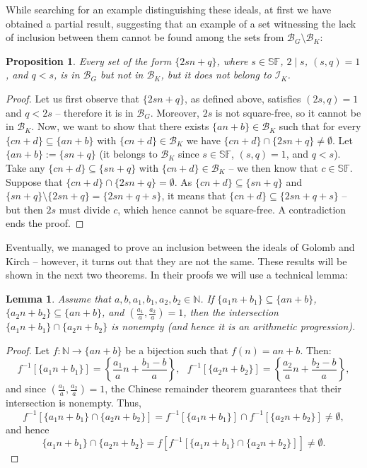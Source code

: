 \documentclass{amsart}
\newtheorem{lem}[thm]{Lemma}
\newtheorem{prop}[thm]{Proposition}
\theoremstyle{definition}
\theoremstyle{definition}
\newcommand{\N}{{\mathbb N}}
\newcommand{\I}{\mathcal I}
\newcommand{\B}{\mathcal{B}}
\newcommand{\SqrFr}{\mathbb{SF}}
\begin{document}
While searching for an example distinguishing these ideals, at first we have obtained a partial result, suggesting that an example of a set witnessing the lack of inclusion between them cannot be found among the sets from $\B_G \setminus \B_K$:

\begin{prop}
Every set of the form $\{2sn+q\}$, where $s \in\SqrFr$, $2\mid s$, $(s,q)=1$, and $q<s$, is in $\B_G$ but not in $\B_K$, but it does not belong to $\I_K$.
\end{prop}

\begin{proof}
Let us first observe that $\{2sn+q\}$, as defined above, satisfies $(2s,q)=1$ and $q<2s$ -- therefore it is in $\B_G$. Moreover, $2s$ is not square-free, so it cannot be in $\B_K$.
Now, we want to show that there exists $\{an+b\}\in \B_K$ such that for every $\{cn+d\}\subseteq \{an+b\}$ with $\{cn+d\}\in \B_K$ we have $\{cn+d\}\cap \{2sn+q\} \neq \emptyset$. Let $\{an+b\} := \{sn+q\}$ (it belongs to $\B_K$ since $s\in\SqrFr$, $(s,q)=1$, and $q<s$). Take any $\{cn+d\}\subseteq \{sn+q\}$ with $\{cn+d\}\in \B_K$ -- we then know that $c\in\SqrFr$. Suppose that $\{cn+d\}\cap \{2sn+q\} = \emptyset$. As $\{cn+d\}\subseteq \{sn+q\}$ and $\{sn+q\} \setminus \{2sn+q\} = \{2sn+q+s\}$, it means that $\{cn+d\}\subseteq \{2sn+q+s\}$ -- but then $2s$ must divide $c$, which hence cannot be square-free. A contradiction ends the proof.
\end{proof}

Eventually, we managed to prove an inclusion between the ideals of Golomb and Kirch -- however, it turns out that they are not the same. These results will be shown in the next two theorems. In their proofs we will use a technical lemma:
 
\begin{lem} \label{lemCRT}
Assume that $a,b,a_1,b_1,a_2,b_2 \in\N$. If $\{a_1 n+b_1\}\subseteq \{an+b\}$, $\{a_2 n+b_2\}\subseteq \{an+b\}$, and $\left(\frac{a_1}{a},\frac{a_2}{a}\right)=1$, then the intersection $\{a_1 n+b_1\}\cap\{a_2 n+b_2\}$ is nonempty (and hence it is an arithmetic progression). 
\end{lem}
\begin{proof}
Let $f\colon\N\to \{an+b\}$ be a bijection such that $f(n) = an+b$. Then: 
$$f^{-1}[\{a_1 n+b_1\}] = \left\{\frac{a_1}{a} n+\frac{b_1-b}{a}\right\},\ \ \ f^{-1}[\{a_2 n+b_2\}] = \left\{\frac{a_2}{a} n+\frac{b_2-b}{a}\right\},$$
and since $\left(\frac{a_1}{a},\frac{a_2}{a}\right)=1$, the Chinese remainder theorem guarantees that their intersection is nonempty. Thus,
$$f^{-1}[\{a_1 n+b_1\}\cap\{a_2 n+b_2\}] = f^{-1}[\{a_1 n+b_1\}]\cap f^{-1}[\{a_2 n+b_2\}]\neq\emptyset,$$
and hence
$$\{a_1 n+b_1\}\cap\{a_2 n+b_2\} = f[f^{-1}[\{a_1 n+b_1\}\cap\{a_2 n+b_2\}]] \neq\emptyset.$$
\end{proof}
\end{document}
